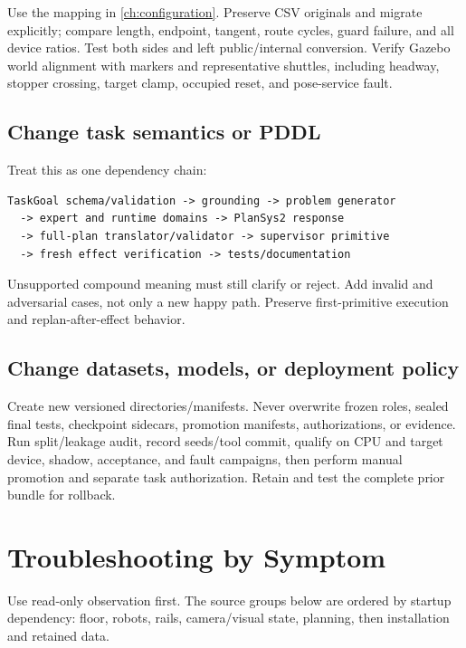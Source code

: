 Use the mapping in \cref{ch:configuration}. Preserve CSV originals and migrate
explicitly; compare length, endpoint, tangent, route cycles, guard failure, and
all device ratios. Test both sides and left public/internal conversion. Verify
Gazebo world alignment with markers and representative shuttles, including
headway, stopper crossing, target clamp, occupied reset, and pose-service fault.

\subsection{Change task semantics or PDDL}

Treat this as one dependency chain:

\begin{lstlisting}
TaskGoal schema/validation -> grounding -> problem generator
  -> expert and runtime domains -> PlanSys2 response
  -> full-plan translator/validator -> supervisor primitive
  -> fresh effect verification -> tests/documentation
\end{lstlisting}

Unsupported compound meaning must still clarify or reject. Add invalid and
adversarial cases, not only a new happy path. Preserve first-primitive execution
and replan-after-effect behavior.

\subsection{Change datasets, models, or deployment policy}

Create new versioned directories/manifests. Never overwrite frozen roles,
sealed final tests, checkpoint sidecars, promotion manifests, authorizations,
or evidence. Run split/leakage audit, record seeds/tool commit, qualify on CPU
and target device, shadow, acceptance, and fault campaigns, then perform manual
promotion and separate task authorization. Retain and test the complete prior
bundle for rollback.

\section{Troubleshooting by Symptom}

Use read-only observation first. The source groups below are ordered by startup
dependency: floor, robots, rails, camera/visual state, planning, then
installation and retained data.

